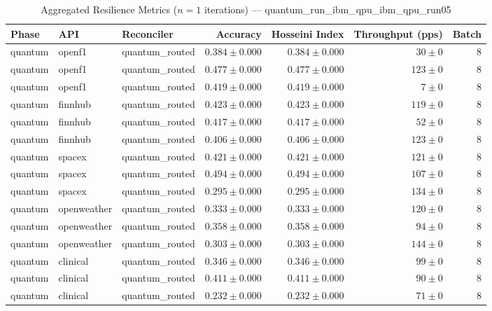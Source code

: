 
\begin{table}[htbp]
\caption{Aggregated Resilience Metrics ($n=1$ iterations) --- quantum_run_ibm_qpu_ibm_qpu_run05}
\begin{tabular}{l l l r r r r}
\hline
Phase & API & Reconciler & Accuracy & Hosseini Index & Throughput (pps) & Batch \\
\hline
quantum & openf1 & quantum\_routed & $0.384\pm0.000$ & $0.384\pm0.000$ & $30\pm0$ & 8 \\
quantum & openf1 & quantum\_routed & $0.477\pm0.000$ & $0.477\pm0.000$ & $123\pm0$ & 8 \\
quantum & openf1 & quantum\_routed & $0.419\pm0.000$ & $0.419\pm0.000$ & $7\pm0$ & 8 \\
quantum & finnhub & quantum\_routed & $0.423\pm0.000$ & $0.423\pm0.000$ & $119\pm0$ & 8 \\
quantum & finnhub & quantum\_routed & $0.417\pm0.000$ & $0.417\pm0.000$ & $52\pm0$ & 8 \\
quantum & finnhub & quantum\_routed & $0.406\pm0.000$ & $0.406\pm0.000$ & $123\pm0$ & 8 \\
quantum & spacex & quantum\_routed & $0.421\pm0.000$ & $0.421\pm0.000$ & $121\pm0$ & 8 \\
quantum & spacex & quantum\_routed & $0.494\pm0.000$ & $0.494\pm0.000$ & $107\pm0$ & 8 \\
quantum & spacex & quantum\_routed & $0.295\pm0.000$ & $0.295\pm0.000$ & $134\pm0$ & 8 \\
quantum & openweather & quantum\_routed & $0.333\pm0.000$ & $0.333\pm0.000$ & $120\pm0$ & 8 \\
quantum & openweather & quantum\_routed & $0.358\pm0.000$ & $0.358\pm0.000$ & $94\pm0$ & 8 \\
quantum & openweather & quantum\_routed & $0.303\pm0.000$ & $0.303\pm0.000$ & $144\pm0$ & 8 \\
quantum & clinical & quantum\_routed & $0.346\pm0.000$ & $0.346\pm0.000$ & $99\pm0$ & 8 \\
quantum & clinical & quantum\_routed & $0.411\pm0.000$ & $0.411\pm0.000$ & $90\pm0$ & 8 \\
quantum & clinical & quantum\_routed & $0.232\pm0.000$ & $0.232\pm0.000$ & $71\pm0$ & 8 \\

\end{tabular}
\end{table}
